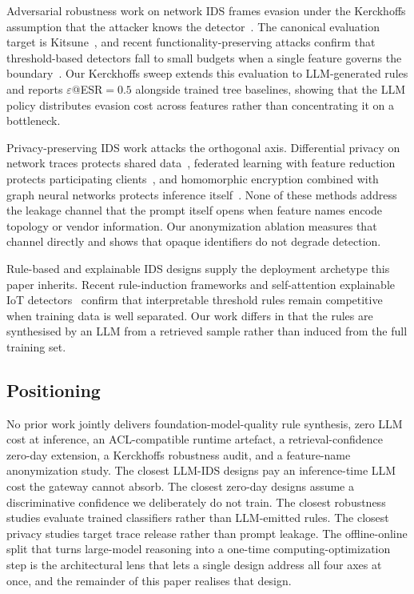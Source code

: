 Adversarial robustness work on network IDS frames evasion under the
Kerckhoffs assumption that the attacker knows the
detector~\cite{apruzzese2021realistic,andrew2024adversarialchallenges,khamaiseh2023evasionreview}.
The canonical evaluation target is Kitsune~\cite{mirsky2018kitsune}, and
recent functionality-preserving attacks confirm that threshold-based
detectors fall to small budgets when a single feature governs the
boundary~\cite{teuffenbach2022funcpreserving}. Our Kerckhoffs sweep
extends this evaluation to LLM-generated rules and reports
$\varepsilon$@ESR$=0.5$ alongside trained tree baselines, showing that
the LLM policy distributes evasion cost across features rather than
concentrating it on a bottleneck.

Privacy-preserving IDS work attacks the orthogonal axis. Differential
privacy on network traces protects shared
data~\cite{fan2021condensationdp}, federated learning with feature
reduction protects participating
clients~\cite{springer2025federatedfeatured}, and homomorphic encryption
combined with graph neural networks protects inference
itself~\cite{scireports2025hegnn_iiot}. None of these methods address
the leakage channel that the prompt itself opens when feature names
encode topology or vendor information. Our anonymization ablation
measures that channel directly and shows that opaque identifiers do not
degrade detection.

Rule-based and explainable IDS designs supply the deployment archetype
this paper inherits. Recent rule-induction frameworks
\cite{sensors2025ruleinduction} and self-attention explainable IoT
detectors~\cite{scireports2025xaiids} confirm that interpretable
threshold rules remain competitive when training data is well separated.
Our work differs in that the rules are synthesised by an LLM from a
retrieved sample rather than induced from the full training set.

\subsection{Positioning}
\label{subsec:rw_position}

No prior work jointly delivers foundation-model-quality rule synthesis,
zero LLM cost at inference, an ACL-compatible runtime artefact, a
retrieval-confidence zero-day extension, a Kerckhoffs robustness audit,
and a feature-name anonymization study. The closest LLM-IDS designs pay
an inference-time LLM cost the gateway cannot absorb. The closest
zero-day designs assume a discriminative confidence we deliberately do
not train. The closest robustness studies evaluate trained classifiers
rather than LLM-emitted rules. The closest privacy studies target trace
release rather than prompt leakage. The offline-online split that turns
large-model reasoning into a one-time computing-optimization step is the
architectural lens that lets a single design address all four axes at
once, and the remainder of this paper realises that design.
